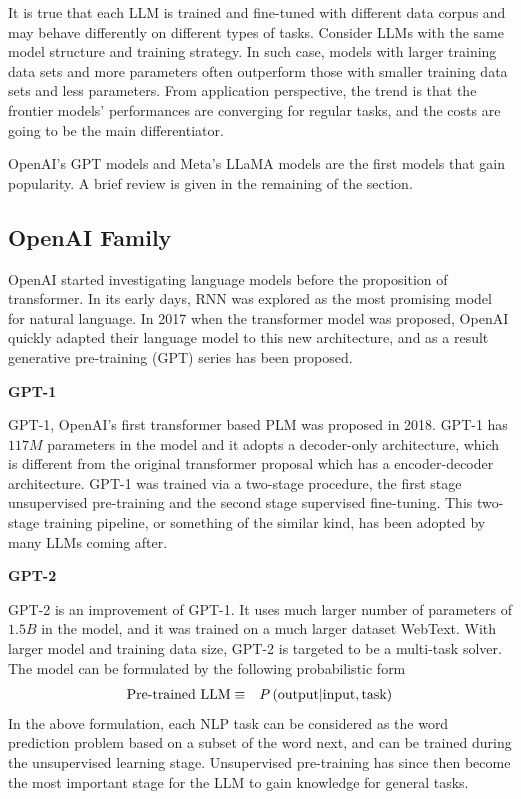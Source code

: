 It is true that each LLM is trained and fine-tuned with different data corpus and may behave differently on different types of tasks. Consider LLMs with the same model structure and training strategy. In such case, models with larger training data sets and more parameters often outperform those with smaller training data sets and less parameters. From application perspective, the trend is that the frontier models' performances are converging for regular tasks, and the costs are going to be the main differentiator. 

OpenAI's GPT models and Meta's LLaMA models are the first models that gain popularity. A brief review is given in the remaining of the section.

\subsection{OpenAI Family}

OpenAI started investigating language models before the proposition of transformer. In its early days, RNN was explored as the most promising model for natural language. In 2017 when the transformer model was proposed, OpenAI quickly adapted their language model to this new architecture, and as a result generative pre-training (GPT) series has been proposed.

\vspace{0.1in}
\noindent \textbf{GPT-1}
\vspace{0.1in}

GPT-1, OpenAI's first transformer based PLM was proposed in 2018. GPT-1 has $117M$ parameters in the model and it adopts a decoder-only architecture, which is different from the original transformer proposal which has a encoder-decoder architecture. GPT-1 was trained via a two-stage procedure, the first stage unsupervised pre-training and the second stage supervised fine-tuning. This two-stage training pipeline, or something of the similar kind, has been adopted by many LLMs coming after.

\vspace{0.1in}
\noindent \textbf{GPT-2}
\vspace{0.1in}

GPT-2 is an improvement of GPT-1. It uses much larger number of parameters of $1.5B$ in the model, and it was trained on a much larger dataset WebText. With larger model and training data size, GPT-2 is targeted to be a multi-task solver. The model can be formulated by the following probabilistic form
\begin{eqnarray}
  \textup{Pre-trained LLM} &\equiv& P\left(\textup{output}\middle|\textup{input}, \textup{task}\right) \nonumber
\end{eqnarray}
In the above formulation, each NLP task can be considered as the word prediction problem based on a subset of the word next, and can be trained during the unsupervised learning stage. Unsupervised pre-training has since then become the most important stage for the LLM to gain knowledge for general tasks.

